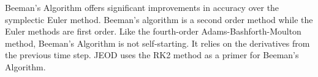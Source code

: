 Beeman's Algorithm offers significant improvements in accuracy over
the symplectic Euler method. Beeman's algorithm is a second order method
while the Euler methods are first order. Like the fourth-order
Adams-Bashforth-Moulton method, Beeman's Algorithm
is not self-starting. It relies on the derivatives from the previous
time step. JEOD uses the RK2 method as a primer for Beeman's Algorithm.

